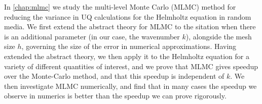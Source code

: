 In \cref{chap:mlmc} we study the multi-level Monte Carlo (MLMC) method for reducing the variance in UQ calculations for the Helmholtz equation in random media. We first extend the abstract theory for MLMC to the sitation when there is an additional parameter (in our case, the wavenumber $k$), alongside the mesh size $h$, governing the size of the error in numerical approximations. Having extended the abstract theory, we then apply it to the Helmholtz equation for a variety of different quantities of interest, and we prove that MLMC gives speedup over the Monte-Carlo method, and that this speedup is independent of $k$. We then investigate MLMC numerically, and find that in many cases the speedup we observe in numerics is better than the speedup we can prove rigorously.

